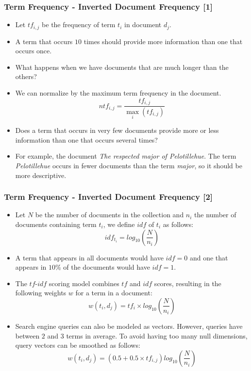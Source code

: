 \documentclass[handout]{beamer}
\begin{document}
\begin{frame}\frametitle{Term Frequency - Inverted Document Frequency [1]}
\footnotesize{
\begin{itemize}
 \item Let $tf_{i,j}$ be the frequency of term $t_{i}$ in document $d_{j}$.
 \item A term that occurs $10$ times should provide more information than one that occurs once.
 \item  What happens when we have documents that are much longer than the others?
 \item We can normalize by the maximum term frequency in the document. 
\begin{displaymath}
 ntf_{i,j}=\frac{tf_{i,j}}{\max_i (tf_{i,j})}
\end{displaymath}
\item  Does a term that occurs in very few documents provide more or less information than one that occurs several times?
\item For example, the document \emph{The respected major of Pelotillehue}. The term \emph{Pelotillehue} occurs in fewer documents than the term \emph{major}, so it should be more descriptive. 
\end{itemize}


} 
\end{frame}

\begin{frame}\frametitle{Term Frequency - Inverted Document Frequency [2]}
\footnotesize{ 
\begin{itemize}
 \item Let $N$ be the number of documents in the collection and $n_{i}$ the number of documents containing term $t_{i}$, we define $idf$ of $t_{i}$ as follows: 
 \begin{displaymath}
  idf_{t_{i}}= log_{10}(\frac{N}{n_{i}})
 \end{displaymath}
\item A term that appears in all documents would have $idf=0$ and one that appears in $10\%$ of the documents would have $idf=1$.

\item The $tf$-$idf$ scoring model combines $tf$ and $idf$ scores, resulting in the following weights $w$ for a term in a document:
\begin{displaymath}
w(t_{i},d_{j})=tf_{i}\times log_{10}(\frac{N}{n_{i}}) 
\end{displaymath}

\item Search engine queries can also be modeled as vectors. However, queries have  between $2$ and $3$ terms in average. To avoid having too many null dimensions, query vectors can be smoothed as follows:
\begin{displaymath}
 w(t_{i},d_{j})=(0.5+0.5\times tf_{i,j})log_{10}(\frac{N}{n_{i}}) 
\end{displaymath}



\end{itemize}



}

\end{frame}
\end{document}
